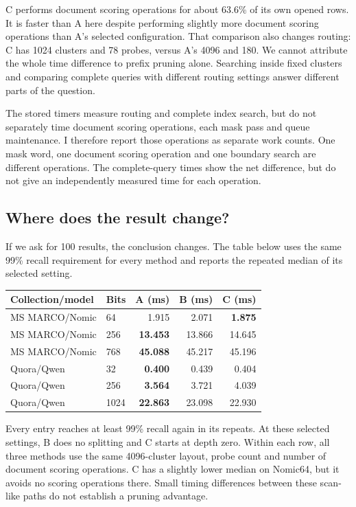C performs document scoring operations for about 63.6\% of its own opened rows. It is faster than A here despite performing slightly more document scoring operations than A's selected configuration. That comparison also changes routing: C has 1024 clusters and 78 probes, versus A's 4096 and 180. We cannot attribute the whole time difference to prefix pruning alone. Searching inside fixed clusters and comparing complete queries with different routing settings answer different parts of the question.

The stored timers measure routing and complete index search, but do not separately time document scoring operations, each mask pass and queue maintenance. I therefore report those operations as separate work counts. One mask word, one document scoring operation and one boundary search are different operations. The complete-query times show the net difference, but do not give an independently measured time for each operation.

\subsection{Where does the result change?}
If we ask for 100 results, the conclusion changes. The table below uses the same 99\% recall requirement for every method and reports the repeated median of its selected setting.

\begin{center}\small
\begin{tabular}{@{}llrrr@{}}\toprule
Collection/model & Bits & A (ms) & B (ms) & C (ms)\\\midrule
MS MARCO/Nomic & 64 & 1.915 & 2.071 & \textbf{1.875}\\
MS MARCO/Nomic & 256 & \textbf{13.453} & 13.866 & 14.645\\
MS MARCO/Nomic & 768 & \textbf{45.088} & 45.217 & 45.196\\
Quora/Qwen & 32 & \textbf{0.400} & 0.439 & 0.404\\
Quora/Qwen & 256 & \textbf{3.564} & 3.721 & 4.039\\
Quora/Qwen & 1024 & \textbf{22.863} & 23.098 & 22.930\\\bottomrule
\end{tabular}
\end{center}
Every entry reaches at least 99\% recall again in its repeats. At these selected settings, B does no splitting and C starts at depth zero. Within each row, all three methods use the same 4096-cluster layout, probe count and number of document scoring operations. C has a slightly lower median on Nomic64, but it avoids no scoring operations there. Small timing differences between these scan-like paths do not establish a pruning advantage.

